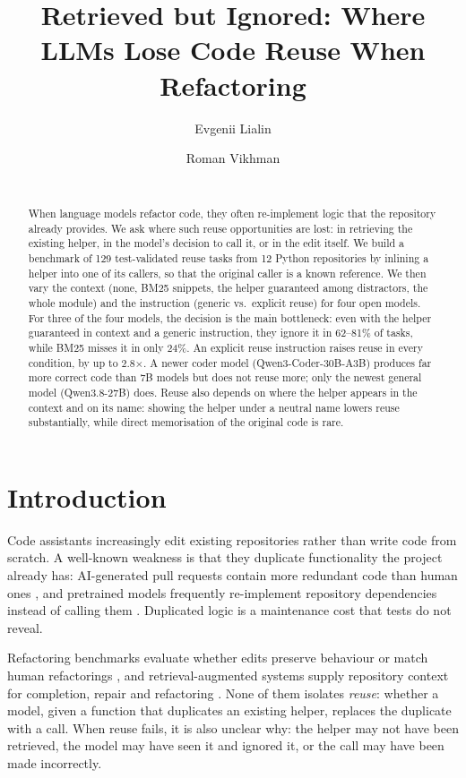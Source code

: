 \documentclass[11pt]{article}
\title{Retrieved but Ignored: Where LLMs Lose Code Reuse When Refactoring}
\author{Evgenii Lialin \and Roman Vikhman \\
  \todo{affiliation} \\
  \texttt{\todo{emails}}}
\begin{document}
\maketitle

\begin{abstract}
When language models refactor code, they often re-implement logic that the repository already provides.
We ask where such reuse opportunities are lost: in retrieving the existing helper, in the model's decision
to call it, or in the edit itself. We build a benchmark of 129 test-validated reuse tasks from 12 Python
repositories by inlining a helper into one of its callers, so that the original caller is a known reference.
We then vary the context (none, BM25 snippets, the helper guaranteed among distractors, the whole module)
and the instruction (generic vs.\ explicit reuse) for four open models.
For three of the four models, the decision is the main bottleneck: even with the helper guaranteed in context
and a generic instruction, they ignore it in 62--81\% of tasks, while BM25 misses it in only 24\%.
An explicit reuse instruction raises reuse in every condition, by up to 2.8$\times$.
A newer coder model (Qwen3-Coder-30B-A3B) produces far more correct code than 7B models but does not reuse more;
only the newest general model (Qwen3.8-27B) does. Reuse also depends on where the helper appears
in the context and on its name: showing the helper under a neutral name lowers reuse substantially,
while direct memorisation of the original code is rare.
\end{abstract}

\section{Introduction}

Code assistants increasingly edit existing repositories rather than write code from scratch.
A well-known weakness is that they duplicate functionality the project already has:
AI-generated pull requests contain more redundant code than human ones \citep{huang2026codereuseinvestigatingcode},
and pretrained models frequently re-implement repository dependencies instead of calling them
\citep{hai-etal-2025-impacts}. Duplicated logic is a maintenance cost that tests do not reveal.

Refactoring benchmarks evaluate whether edits preserve behaviour or match human refactorings
\citep{xu2026swerefactorrepositorylevelbenchmarkrealworld,gautam2025refactorbenchevaluatingstatefulreasoning,thillen2026codetastellmsgeneratehumanlevel},
and retrieval-augmented systems supply repository context for completion, repair and refactoring
\citep{zhang-etal-2025-coderag,xiong-etal-2025-think,xu2025mantraenhancingautomatedmethodlevel}.
None of them isolates \emph{reuse}: whether a model, given a function that duplicates an existing helper,
replaces the duplicate with a call. When reuse fails, it is also unclear why: the helper may not have
been retrieved, the model may have seen it and ignored it, or the call may have been made incorrectly.
\end{document}
